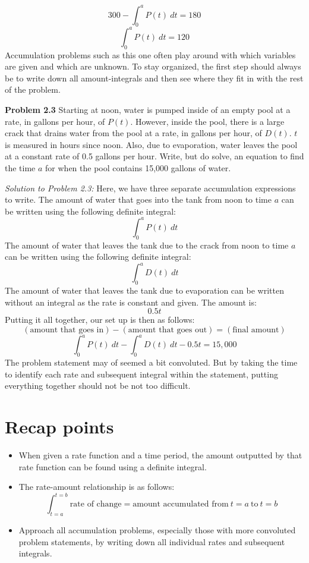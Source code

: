 \documentclass[11pt]{scrartcl}
\begin{document}
$$300-\int_0^a{P(t) \ dt}=180$$
$$\int_0^a P(t) \ dt=120$$
\noindent 
Accumulation problems such as this one often play around with which variables are given and which are unknown. To stay organized, the first step should always be to write down all amount-integrals and then see where they fit in with the rest of the problem. 
\begin{tcolorbox}[colback=purple!5!white,colframe=purple!75!black]
\textbf{Problem 2.3} Starting at noon, water is pumped inside of an empty pool at a rate, in gallons per hour, of $P(t)$. However, inside the pool, there is a large crack that drains water from the pool at a rate, in gallons per hour, of $D(t)$. $t$ is measured in hours since noon. Also, due to evaporation, water leaves the pool at a constant rate of 0.5 gallons per hour. Write, but do solve, an equation to find the time $a$ for when the pool contains 15,000 gallons of water.
\end{tcolorbox}
\noindent 
\textit{Solution to Problem 2.3:} Here, we have three separate accumulation expressions to write. The amount of water that goes into the tank from noon to time $a$ can be written using the following definite integral: 
$$\int_0^a{P(t) \ dt}$$
\noindent 
The amount of water that leaves the tank due to the crack from noon to time $a$ can be written using the following definite integral: 
$$\int_0^a{D(t) \ dt}$$
\noindent 
The amount of water that leaves the tank due to evaporation can be written without an integral as the rate is constant and given. The amount is: 
$$0.5t$$
\noindent 
Putting it all together, our set up is then as follows: 
$$(\text{amount that goes in})-(\text{amount that goes out})=(\text{final amount})$$
$$\int_0^a{P(t) \ dt}-\int_0^a{D(t) \ dt}-0.5t=15,000$$
\noindent 
The problem statement may of seemed a bit convoluted. But by taking the time to identify each rate and subsequent integral within the statement, putting everything together should not be not too difficult. 

\section{Recap points}
\begin{itemize}
    \item When given a rate function and a time period, the amount outputted by that rate function can be found using a definite integral. 
    \item The rate-amount relationship is as follows:  $$\int_{t=a}^{t=b}{\text{rate of change}}=\text{amount accumulated from} \ t=a \ \text{to} \ t=b$$
    \item Approach all accumulation problems, especially those with more convoluted problem statements, by writing down all individual rates and subsequent integrals. 
\end{itemize}
\end{document}
